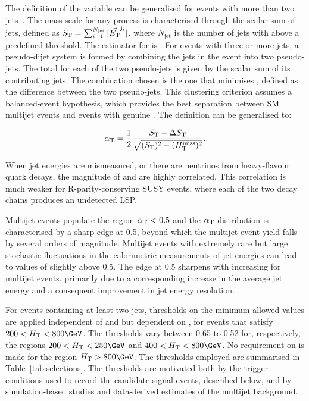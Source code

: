 The definition of the \alphat variable can be generalised for events
with more than two jets~\cite{RA1Paper}. The mass scale for any
process is characterised through the scalar \Et sum of jets, defined
as $S_{\mathrm{T}} = \sum_{i=1}^{N_\text{jet}} |\vec{{E_{\text T}}}^{\mathrm{j}_i}|$,
where $N_\text{jet}$ is the number of jets with \Et above a predefined
threshold. The estimator for \ptvecmiss is \HTmiss. For events with
three or more jets, a pseudo-dijet system is formed by combining the
jets in the event into two pseudo-jets. The total \scalst for each of
the two pseudo-jets is given by the scalar \Et sum of its contributing
jets. The combination chosen is the one that minimises \dst, defined
as the difference between the two pseudo-jets. This clustering
criterion assumes a balanced-event hypothesis, which provides the best
separation between SM multijet events and events with genuine
\ptvecmiss. The \alphat definition can be generalised to:

\begin{equation}
  \label{eq:alphat}
  \alpha_{\text{T}} = \frac{1}{2} \frac{S_{\mathrm{T}} -
    \Delta S_{\mathrm{T}}}{\sqrt{(S_{\mathrm{T}})^2 - (H_{\text{T}}^{\text{miss}})^2}}.
\end{equation}

When jet energies are mismeasured, or there are neutrinos from
heavy-flavour quark decays, the magnitude of \HTmiss and \dst are
highly correlated. This correlation is much weaker for
R-parity-conserving SUSY events, where each of the two decay chains
produces an undetected LSP.

Multijet events populate the region $\alpha_{\text{T}}< 0.5$ and the $\alpha_{\text{T}}$
distribution is characterised by a sharp edge at 0.5, beyond which the
multijet event yield falls by several orders of magnitude. Multijet
events with extremely rare but large stochastic fluctuations in the
calorimetric measurements of jet energies can lead to values of
\alphat slightly above 0.5. The edge at 0.5 sharpens with increasing
\scalht for multijet events, primarily due to a corresponding increase
in the average jet energy and a consequent improvement in jet energy
resolution. 

For events containing at least two jets, thresholds on the minimum
allowed \alphat values are applied independent of \njet and \nb but
dependent on \scalht, for events that satisfy $200 < \scalht <
800\GeV$. The \alphat thresholds vary between 0.65 to 0.52 for,
respectively, the regions $200 < \scalht < 250\GeV$ and $400 < \scalht
< 800\GeV$. No requirement on \alphat is made for the region $\scalht
> 800\GeV$. The thresholds employed are summarised in
Table~\ref{tab:selections}. The \alphat thresholds are motivated both
by the trigger conditions used to record the candidate signal events,
described below, and by simulation-based studies and data-derived
estimates of the multijet background. 

